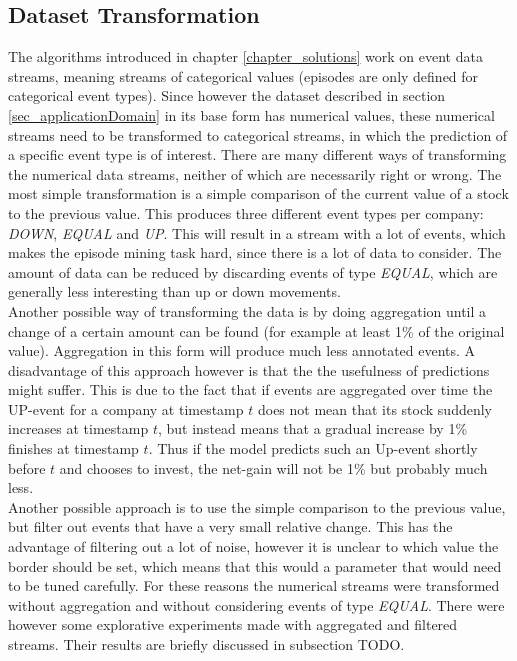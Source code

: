 \subsection{Dataset Transformation}
\label{subsec_transformation}
The algorithms introduced in chapter \ref{chapter_solutions} work on event data streams, meaning streams of categorical values (episodes are only defined for categorical event types). Since however the dataset described in section \ref{sec_applicationDomain} in its base form has numerical values, these numerical streams need to be transformed to categorical streams, in which the prediction of a specific event type is of interest. There are many different ways of transforming the numerical data streams, neither of which are necessarily right or wrong. The most simple transformation is a simple comparison of the current value of a stock to the previous value. This produces three different event types per company: \textit{DOWN}, \textit{EQUAL} and \textit{UP}. This will result in a stream with a lot of events, which makes the episode mining task hard, since there is a lot of data to consider. The amount of data can be reduced by discarding events of type \textit{EQUAL}, which are generally less interesting than up or down movements. \\
Another possible way of transforming the data is by doing aggregation until a change of a certain amount can be found (for example at least 1\% of the original value). Aggregation in this form will produce much less annotated events. A disadvantage of this approach however is that the the usefulness of predictions might suffer. This is due to the fact that if events are aggregated over time the UP-event for a company at timestamp $t$ does not mean that its stock suddenly increases at timestamp $t$, but instead means that a gradual increase by 1\% finishes at timestamp $t$. Thus if the model predicts such an Up-event shortly before $t$ and chooses to invest, the net-gain will not be 1\% but probably much less. \\
Another possible approach is to use the simple comparison to the previous value, but filter out events that have a very small relative change. This has the advantage of filtering out a lot of noise, however it is unclear to which value the border should be set, which means that this would a parameter that would need to be tuned carefully. For these reasons the numerical streams were transformed without aggregation and without considering events of type \textit{EQUAL}. There were however some explorative experiments made with aggregated and filtered streams. Their results are briefly discussed in subsection TODO.

